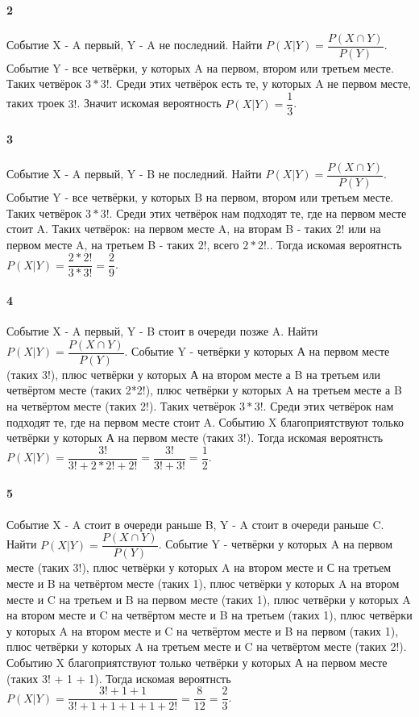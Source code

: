 \documentclass[a4paper,12pt]{article}
\begin{document}
\paragraph{2}
Событие X - A первый, Y - A не последний. Найти \(P(X|Y)=\dfrac{P(X\cap Y)}{P(Y)}\).
Событие Y - все четвёрки, у которых A на первом, втором или третьем месте. Таких четвёрок \(3*3!\). Среди этих четвёрок есть те, у которых A не первом месте, таких троек \(3!\). Значит искомая вероятность \(P(X|Y)=\dfrac{1}{3}\).

\paragraph{3}
Событие X - A первый, Y - B не последний. Найти \(P(X|Y)=\dfrac{P(X\cap Y)}{P(Y)}\).  Событие Y - все четвёрки, у которых B на первом, втором или третьем месте. Таких четвёрок \(3*3!\). Среди этих четвёрок нам подходят те, где на первом месте стоит A. Таких четвёрок: на первом месте A, на вторам B - таких \(2!\) или на первом месте A, на третьем B - таких \(2!\), всего \(2*2!\).. Тогда искомая вероятнсть \(P(X|Y)=\dfrac{2*2!}{3*3!}=\dfrac{2}{9}\).

\paragraph{4}
Событие X - A первый, Y - B стоит в очереди позже A. Найти \(P(X|Y)=\dfrac{P(X\cap Y)}{P(Y)}\).  Событие Y - четвёрки у которых А на первом месте (таких 3!), плюс четвёрки у которых А на втором месте а B на третьем или четвёртом месте (таких 2*2!), плюс четвёрки у которых A на третьем месте а B на четвёртом месте (таких 2!). Таких четвёрок \(3*3!\). Среди этих четвёрок нам подходят те, где на первом месте стоит A. Событию X благоприятствуют только четвёрки у которых А на первом месте (таких 3!). Тогда искомая вероятнсть \(P(X|Y)=\dfrac{3!}{3!+2*2!+2!}=\dfrac{3!}{3!+3!}=\dfrac{1}{2}\).

\paragraph{5}
Событие X - A стоит в очереди раньше B, Y - A стоит в очереди раньше C. Найти \(P(X|Y)=\dfrac{P(X\cap Y)}{P(Y)}\).
 Событие Y - четвёрки у которых A на первом месте (таких 3!),
 плюс четвёрки у которых A на втором месте и С на третьем месте и B на четвёртом месте (таких 1),
  плюс четвёрки у которых A на втором месте и C на третьем и B на первом месте (таких 1),
    плюс четвёрки у которых A на втором месте и C на четвёртом месте и B на третьем (таких 1),
    плюс четвёрки у которых A на втором месте и C на четвёртом месте и B на первом (таких 1),
     плюс четвёрки у которых A на третьем месте и C на четвёртом месте  (таких 2!). Событию X благоприятствуют только четвёрки у которых А на первом месте (таких 3! + 1 + 1). Тогда искомая вероятнсть \(P(X|Y)=\dfrac{3! + 1+1}{3!+ 1 + 1+1+1+2!}=\dfrac{8}{12}=\dfrac{2}{3}\).
\end{document}
